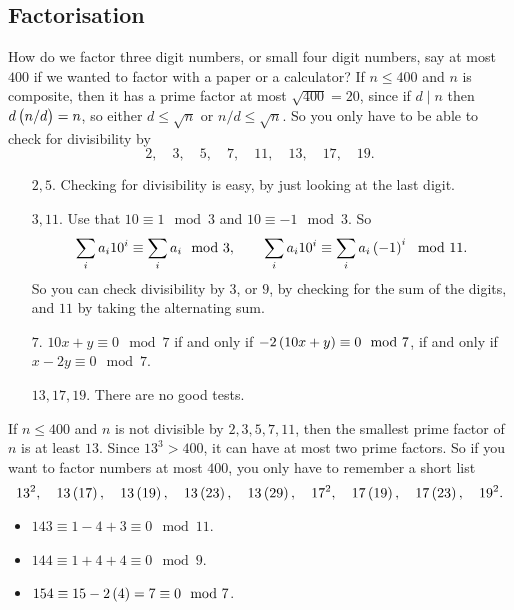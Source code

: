 \subsection{Factorisation}

How do we factor three digit numbers, or small four digit numbers, say at most $ 400 $ if we wanted to factor with a paper or a calculator? If $ n \le 400 $ and $ n $ is composite, then it has a prime factor at most $ \sqrt{400} = 20 $, since if $ d \mid n $ then $ d\br{n / d} = n $, so either $ d \le \sqrt{n} $ or $ n / d \le \sqrt{n} $. So you only have to be able to check for divisibility by
$$ 2, \quad 3, \quad 5, \quad 7, \quad 11, \quad 13, \quad 17, \quad 19. $$
\begin{itemize}[leftmargin=0.75in]
\item[$ 2, 5 $.] Checking for divisibility is easy, by just looking at the last digit.
\item[$ 3, 11 $.] Use that $ 10 \equiv 1 \mod 3 $ and $ 10 \equiv -1 \mod 3 $. So
$$ \sum_i a_i10^i \equiv \sum_i a_i \mod 3, \qquad \sum_i a_i10^i \equiv \sum_i a_i\br{-1}^i \mod 11. $$
So you can check divisibility by $ 3 $, or $ 9 $, by checking for the sum of the digits, and $ 11 $ by taking the alternating sum.
\item[$ 7 $.] $ 10x + y \equiv 0 \mod 7 $ if and only if $ -2\br{10x + y} \equiv 0 \mod 7 $, if and only if $ x - 2y \equiv 0 \mod 7 $.
\item[$ 13, 17, 19 $.] There are no good tests.
\end{itemize}
If $ n \le 400 $ and $ n $ is not divisible by $ 2, 3, 5, 7, 11 $, then the smallest prime factor of $ n $ is at least $ 13 $. Since $ 13^3 > 400 $, it can have at most two prime factors. So if you want to factor numbers at most $ 400 $, you only have to remember a short list
$$ 13^2, \quad 13\br{17}, \quad 13\br{19}, \quad 13\br{23}, \quad 13\br{29}, \quad 17^2, \quad 17\br{19}, \quad 17\br{23}, \quad 19^2. $$

\begin{example*}
\hfill
\begin{itemize}
\item $ 143 \equiv 1 - 4 + 3 \equiv 0 \mod 11 $.
\item $ 144 \equiv 1 + 4 + 4 \equiv 0 \mod 9 $.
\item $ 154 \equiv 15 - 2\br{4} = 7 \equiv 0 \mod 7 $.
\end{itemize}
\end{example*}


